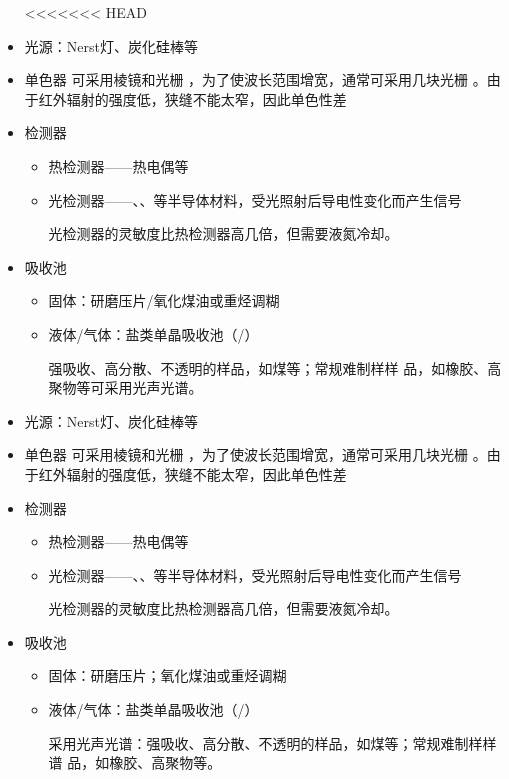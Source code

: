 \begin{itemize}
<<<<<<< HEAD
    \item 光源：Nerst灯、炭化硅棒等
    \item 单色器
可采用棱镜和光栅
，为了使波长范围增宽，通常可采用几块光栅
。由于红外辐射的强度低，狭缝不能太窄，因此单色性差
    \item 检测器
    \begin{itemize}
        \item 热检测器——热电偶等
        \item 光检测器——、、等半导体材料，受光照射后导电性变化而产生信号
        \begin{note}
            光检测器的灵敏度比热检测器高几倍，但需要液氮冷却。
        \end{note}
    \end{itemize}
    \item  吸收池
    \begin{itemize}
        \item 固体：研磨压片/氧化煤油或重烃调糊
        \item 液体/气体：盐类单晶吸收池（/）
        \begin{note}
强吸收、高分散、不透明的样品，如煤等；常规难制样样
品，如橡胶、高聚物等可采用光声光谱。
        \end{note}
    \end{itemize}

	\item 光源：Nerst灯、炭化硅棒等
	\item 单色器
	可采用棱镜和光栅
	，为了使波长范围增宽，通常可采用几块光栅
	。由于红外辐射的强度低，狭缝不能太窄，因此单色性差
	\item 检测器
	\begin{itemize}
		\item 热检测器——热电偶等
		\item 光检测器——、、等半导体材料，受光照射后导电性变化而产生信号
		\begin{note}
			光检测器的灵敏度比热检测器高几倍，但需要液氮冷却。
		\end{note}
	\end{itemize}
	\item  吸收池
	\begin{itemize}
		\item 固体：研磨压片；氧化煤油或重烃调糊
		\item 液体/气体：盐类单晶吸收池（/）
		\begin{note}
			采用光声光谱：强吸收、高分散、不透明的样品，如煤等；常规难制样样
			谱                 品，如橡胶、高聚物等。
		\end{note}
	\end{itemize}
	
\end{itemize}
